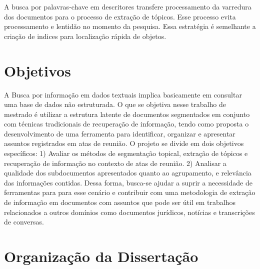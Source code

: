 
A busca por palavras-chave em descritores transfere processamento da varredura dos documentos para o processo de extração de tópicos. Esse processo evita processamento e lentidão no momento da pesquisa. Essa estratégia é semelhante a criação de indices para localização rápida de objetos.





\section{Objetivos}

A Busca por informação em dados textuais implica basicamente em consultar uma base de dados não estruturada. O que se objetiva nesse trabalho de mestrado é utilizar a estrutura latente de documentos segmentados em conjunto com técnicas tradicionais de recuperação de informação, tendo como 
proposta o desenvolvimento de uma ferramenta para identificar, organizar e apresentar assuntos registrados em atas de reunião. O projeto se divide em dois objetivos específicos: 1) Avaliar os métodos de segmentação topical, extração de tópicos e recuperação de informação no contexto de atas de reunião. 2) Analisar a qualidade dos subdocumentos apresentados quanto ao agrupamento, e relevância das informações contidas.
Dessa forma, busca-se ajudar a suprir a necessidade de ferramentas para para esse cenário e contribuir com uma metodologia de extração de informação em documentos com assuntos que pode ser útil em trabalhos relacionados a outros domínios como documentos jurídicos, notícias e transcrições de conversas.











\section{Organização da Dissertação}





